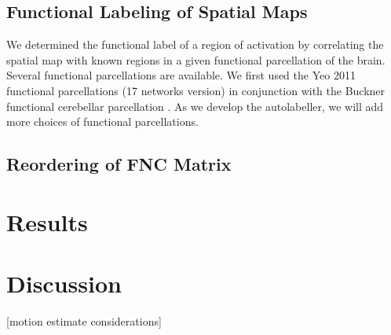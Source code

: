 \documentclass[letter]{article}
\begin{document}
\subsection{Functional Labeling of Spatial Maps}

We determined the functional label of a region of activation by correlating the spatial map with known regions in a given functional parcellation of the brain.
Several functional parcellations are available.
We first used the Yeo 2011 functional parcellations (17 networks version) in conjunction with the Buckner functional cerebellar parcellation \cite{b3,b4}.
As we develop the autolabeller, we will add more choices of functional parcellations.

\subsection{Reordering of FNC Matrix}

\section{Results}

\section{Discussion}

[motion estimate considerations]

\begin{acronym}
\end{acronym}



\end{document}
